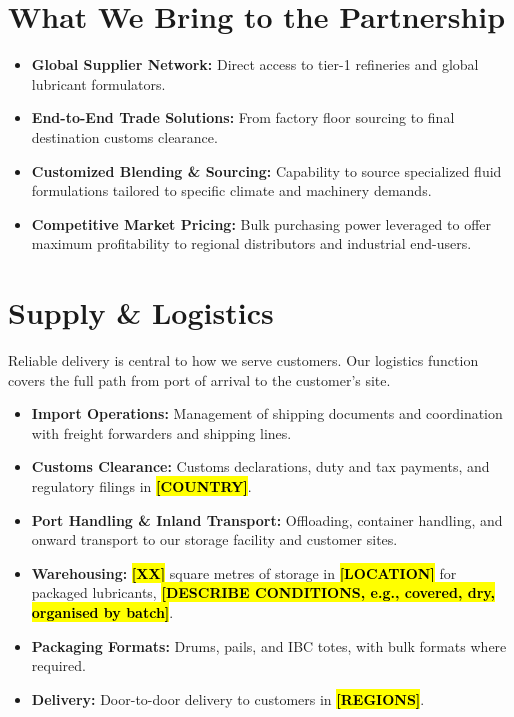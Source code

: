 \documentclass[11pt,letterpaper]{article}
\let\OmpOldSection\section
\renewcommand{\section}{\needspace{5\baselineskip}\OmpOldSection}
\newcommand{\todo}[1]{{\color{black}\bfseries\hl{[#1]}}}
\begin{document}
\section{What We Bring to the Partnership}

\begin{itemize}
  \item \textbf{Global Supplier Network:} Direct access to tier-1 refineries
        and global lubricant formulators.
  \item \textbf{End-to-End Trade Solutions:} From factory floor sourcing to
        final destination customs clearance.
  \item \textbf{Customized Blending \& Sourcing:} Capability to source
        specialized fluid formulations tailored to specific climate and
        machinery demands.
  \item \textbf{Competitive Market Pricing:} Bulk purchasing power leveraged
        to offer maximum profitability to regional distributors and industrial
        end-users.
\end{itemize}

\section{Supply \& Logistics}

Reliable delivery is central to how we serve customers. Our logistics function
covers the full path from port of arrival to the customer's site.

\begin{itemize}
  \item \textbf{Import Operations:} Management of shipping documents and
        coordination with freight forwarders and shipping lines.
  \item \textbf{Customs Clearance:} Customs declarations, duty and tax
        payments, and regulatory filings in \todo{COUNTRY}.
  \item \textbf{Port Handling \& Inland Transport:} Offloading, container
        handling, and onward transport to our storage facility and customer
        sites.
  \item \textbf{Warehousing:} \todo{XX} square metres of storage in
        \todo{LOCATION} for packaged lubricants,
        \todo{DESCRIBE CONDITIONS, e.g., covered, dry, organised by batch}.
  \item \textbf{Packaging Formats:} Drums, pails, and IBC totes, with bulk
        formats where required.
  \item \textbf{Delivery:} Door-to-door delivery to customers in
        \todo{REGIONS}.
\end{itemize}
\end{document}
